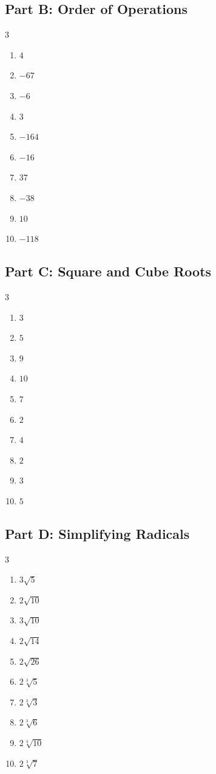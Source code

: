 \documentclass[11pt]{article}
\begin{document}
\subsection*{Part B: Order of Operations}
\begin{multicols}{3}
\begin{enumerate}
  \item $4$
  \item $-67$
  \item $-6$
  \item $3$
  \item $-164$
  \item $-16$
  \item $37$
  \item $-38$
  \item $10$
  \item $-118$
\end{enumerate}
\end{multicols}
\subsection*{Part C: Square and Cube Roots}
\begin{multicols}{3}
\begin{enumerate}
  \item $3$
  \item $5$
  \item $9$
  \item $10$
  \item $7$
  \item $2$
  \item $4$
  \item $2$
  \item $3$
  \item $5$
\end{enumerate}
\end{multicols}
\subsection*{Part D: Simplifying Radicals}
\begin{multicols}{3}
\begin{enumerate}
  \item $3 \sqrt{5}$
  \item $2 \sqrt{10}$
  \item $3 \sqrt{10}$
  \item $2 \sqrt{14}$
  \item $2 \sqrt{26}$
  \item $2 \sqrt[3]{5}$
  \item $2 \sqrt[3]{3}$
  \item $2 \sqrt[3]{6}$
  \item $2 \sqrt[3]{10}$
  \item $2 \sqrt[3]{7}$
\end{enumerate}
\end{multicols}
\end{document}
